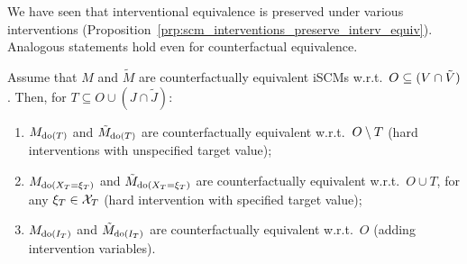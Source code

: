 We have seen that interventional equivalence is preserved under various interventions (Proposition~\ref{prp:scm_interventions_preserve_interv_equiv}).
Analogous statements hold even for counterfactual equivalence.
\begin{Prp}\label{prp:scm_interventions_preserve_counterf_equiv}
  Assume that $M$ and $\tilde{M}$ are counterfactually equivalent iSCMs w.r.t.\ $O \subseteq (V \cap \tilde{V})$. 
  Then, for $T \subseteq O \cup (J \cap \tilde{J})$:
    \begin{enumerate}
      \item $M_{\operatorname{do}(T)}$ and $\tilde{M}_{\operatorname{do}(T)}$ are counterfactually equivalent w.r.t.\ $O \setminus T$ (hard interventions with unspecified target value);
      \item $M_{\operatorname{do}(X_T=\xi_T)}$ and $\tilde{M}_{\operatorname{do}(X_T=\xi_T)}$ are counterfactually equivalent w.r.t.\ $O \cup T$, for any $\xi_T \in \mathcal{X}_T$ (hard intervention with specified target value);
      \item $M_{\operatorname{do}(I_T)}$ and $\tilde{M}_{\operatorname{do}(I_T)}$ are counterfactually equivalent w.r.t.\ $O$ (adding intervention variables).
    \end{enumerate}
\end{Prp}
